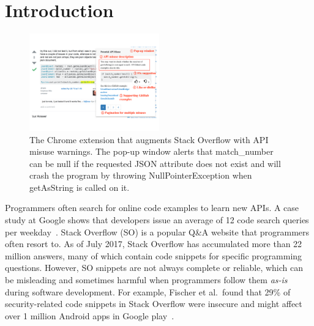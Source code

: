 \section{Introduction}
\label{sec:intro}

\begin{figure}
\centering
\includegraphics[width=0.5\textwidth]{examplecheck-screenshot.pdf}
  \caption{The {\tool} Chrome extension that augments Stack Overflow with API misuse warnings. The pop-up window alerts that {\ttt match\_number} can be {\ttt null} if the requested {\ttt JSON} attribute does not exist and will crash the program by throwing {\ttt NullPointerException} when {\ttt getAsString} is called on it.}
  \label{fig:screenshot}
  \vspace{-0.1in}
\end{figure}

Programmers often search for online code examples to learn new APIs. A case study at Google shows that developers issue an average of 12 code search queries per weekday~\cite{sadowski2015developers}. Stack Overflow (SO) is a popular Q\&A website that programmers often resort to. As of July 2017, Stack Overflow has accumulated more than 22 million answers, many of which contain code snippets for specific programming questions. However, SO snippets are not always complete or reliable, which can be misleading and sometimes harmful when programmers follow them {\em as-is} during software development. For example, Fischer et al.~found that 29\% of security-related code snippets in Stack Overflow were insecure and might affect over 1 million Android apps in Google play~\cite{fischer2017stack}. 

